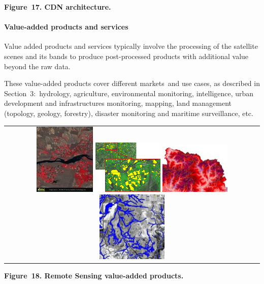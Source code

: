 \documentclass[a4paper]{article}
\begin{document}
{\centering\bfseries
Figure\ 17. CDN architecture.
\par}

\paragraph[Value{}-added products and services]{Value-added products and
services}
Value added products and services typically involve the processing of
the satellite scenes and its bands to produce post-processed products
with additional value beyond the raw data.\ 

These value-added products cover different markets\ and use cases, as
described in Section\ 3:\ hydrology, agriculture, environmental
monitoring, intelligence, urban development and infrastructures
monitoring, mapping, land management (topology, geology, forestry),
disaster monitoring and maritime surveillance, etc.

\begin{flushleft}
\tablehead{}
\begin{supertabular}{c}
 \includegraphics[width=1.15625in,height=1.33056in]{out-img22.jpg} 
\includegraphics[width=1.33056in,height=1.00903in]{out-img23.png} 
\includegraphics[width=1.33056in,height=0.97361in]{out-img24.jpg} 
\includegraphics[width=1.33056in,height=1.33056in]{out-img25.jpg} \\
\end{supertabular}
\end{flushleft}
{\centering\bfseries
Figure\ 18. Remote Sensing value-added products.
\par}
\end{document}
